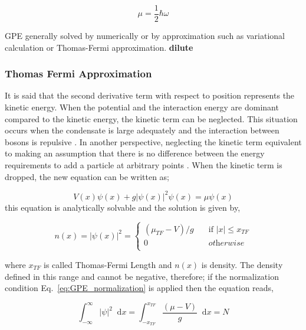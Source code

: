 \documentclass[a4paper,times,hidelinks,12pt]{article}
\newcommand*\dif{\mathop{}\!\mathrm{d}}
\begin{document}
\begin{equation}
\label{eq:GPE_1D_solution_harmonic}
    \mu = \frac{1}{2}\hbar\omega
\end{equation}


GPE generally solved by numerically or by approximation such as variational calculation or Thomas-Fermi approximation. \textbf{dilute}

\subsubsection{Thomas Fermi Approximation}



It is said that the second derivative term with respect to position represents the kinetic energy. When the potential and the interaction energy are dominant compared to the kinetic energy, the kinetic term can be neglected. This situation occurs when the condensate is large adequately and the interaction between bosons is repulsive \cite{pethick2002bose}. In another perspective, neglecting the kinetic term equivalent to making an assumption that there is no difference between the energy requirements to add a particle at arbitrary points \cite{rogel2013gross}. When the kinetic term is dropped, the new equation can be written as;

\begin{equation}
\label{eq:GPE_1D_thomas_fermi}
    V(x)\psi(x) + g|\psi(x)|^2\psi(x) = \mu\psi(x)
\end{equation}
this equation is analytically solvable and the solution is given by,


\begin{equation}
\label{eq:thomas_fermi_solution}    
n(x) = |\psi(x)|^2 =  
    \begin{cases}
        (\mu_{TF} - V)/g &\quad\text{if }  |x| \le x_{TF}  \\
        0 &\quad \textit{otherwise} \\
    \end{cases}
\end{equation}

where $x_{TF}$ is called Thomas-Fermi Length and $n(x)$ is density. The density defined in this range and cannot be negative, therefore; if the normalization condition Eq.~\eqref{eq:GPE_normalization} is applied then the equation reads,  

\begin{equation}
    \label{eq:thomas_fermi_mu_integral}
        \int_{-\infty}^{\infty} |\psi|^2 \dif x = \int_{-x_{TF}}^{x_{TF}} \frac{(\mu - V)}{g} \dif x = N 
    \end{equation}
\end{document}
